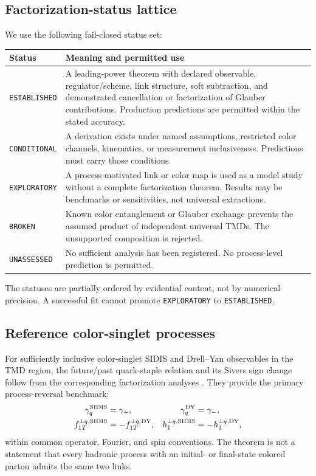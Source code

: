 \documentclass[11pt]{article}
\begin{document}
\subsection{Factorization-status lattice}

We use the following fail-closed status set:
\begin{longtable}{L{0.19\textwidth}L{0.72\textwidth}}
\toprule
Status & Meaning and permitted use\\
\midrule
\endhead
\texttt{ESTABLISHED} &
A leading-power theorem with declared observable, regulator/scheme, link
structure, soft subtraction, and demonstrated cancellation or factorization
of Glauber contributions.  Production predictions are permitted within the
stated accuracy.\\
\texttt{CONDITIONAL} &
A derivation exists under named assumptions, restricted color channels,
kinematics, or measurement inclusiveness.  Predictions must carry those
conditions.\\
\texttt{EXPLORATORY} &
A process-motivated link or color map is used as a model study without a
complete factorization theorem.  Results may be benchmarks or sensitivities,
not universal extractions.\\
\texttt{BROKEN} &
Known color entanglement or Glauber exchange prevents the assumed product of
independent universal TMDs.  The unsupported composition is rejected.\\
\texttt{UNASSESSED} &
No sufficient analysis has been registered.  No process-level prediction is
permitted.\\
\bottomrule
\end{longtable}
The statuses are partially ordered by evidential content, not by numerical
precision.  A successful fit cannot promote \texttt{EXPLORATORY} to
\texttt{ESTABLISHED}.

\subsection{Reference color-singlet processes}

For sufficiently inclusive color-singlet SIDIS and Drell--Yan observables in
the TMD region, the future/past quark-staple relation and its Sivers sign
change follow from the corresponding factorization analyses
\cite{Collins2002,JiMaYuan2004,JiMaYuanSpin2004}.  They provide the primary
process-reversal benchmark:
\begin{align}
 \gamma_q^{\rm SIDIS}&=\gamma_+,
 &\gamma_q^{\rm DY}&=\gamma_-,
\label{eq:sidis-dy-process-map}\\
 f_{1T}^{\perp q,\rm SIDIS}
 &=-f_{1T}^{\perp q,\rm DY},
 &h_1^{\perp q,\rm SIDIS}
 &=-h_1^{\perp q,\rm DY},
\label{eq:sidis-dy-two-signs}
\end{align}
within common operator, Fourier, and spin conventions.  The theorem is not a
statement that every hadronic process with an initial- or final-state colored
parton admits the same two links.
\end{document}
